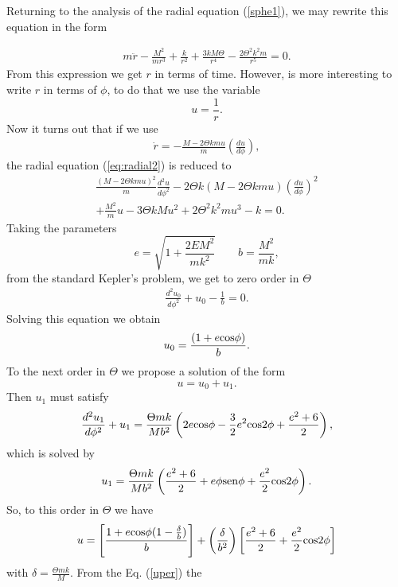 \documentclass[a4paper,12pt]{article}
\newcommand{\rof}[1]{(\ref{eq:#1})}
\begin{document}
Returning to the analysis of the radial equation (\ref{sphe1}), we
may rewrite this equation in the form

\begin{eqnarray}
m\ddot r -\frac{M^{2}}{mr^{3}} +\frac{k}{r^{2}}+\frac{3kM\Theta}{r^{4}}-
\frac{2\Theta^{2}k^{2}m}{r^{5}}=0. \label{eq:radial2}
\end{eqnarray}
From this expression we get $r$ in terms of time. However, is more
interesting to write $r$ in terms of $\phi$, to do that we use the
variable
$$u=\frac{1}{r}.$$
Now it turns out that if we use
\begin{eqnarray}
\dot r =-\frac{M-2\Theta km u}{m}\left(\frac{du}{d\phi}\right),
\end{eqnarray}
the radial equation \rof{radial2} is reduced to
\begin{eqnarray}
\frac{(M-2\Theta kmu)^{2}}{m}\frac{d^{2} u}{d\phi^{2}}-2\Theta k(M-2\Theta kmu)
\left(\frac{d u}{d\phi}\right)^{2}\nonumber \\
+\frac{M^{2}}{m}u-3\Theta kMu^{2}+2\Theta^{2}k^{2}mu^{3}-k=0.
\end{eqnarray}
Taking the parameters
$$e=\sqrt{1+\frac{2EM^{2}}{mk^{2}}}\quad  \quad b=\frac{M^{2}}{mk},$$
from the standard Kepler's problem, we get to zero order in
$\Theta$
\begin{eqnarray}
\frac{d^{2} u_{0}}{d\phi^{2}}+u_{0}-\frac{1}{b}=0.
\end{eqnarray}
Solving this equation we obtain
\begin{eqnarray}
u_{0}=\frac{(1+e{\rm cos} \phi)}{b}.
\end{eqnarray}
To the next order in $\Theta$  we propose a solution of the form
$$u=u_{0}+u_{1}.$$
Then $u_{1}$ must satisfy
\begin{eqnarray}
\frac{d^{2} u_{1}}{d\phi^{2}}+u_{1}=\frac{\Theta mk}{Mb^{2}}\left(2e {\rm cos}\phi
 -\frac{3}{2}e^{2}{\rm cos}2\phi +\frac{e^{2}+6}{2}\right),
\end{eqnarray}
which is solved by
\begin{eqnarray}
u_{1}=\frac{\Theta mk}{Mb^{2}}\left(\frac{e^{2}+6}{2} +e\phi {\rm sen}\phi+
\frac{e^{2}}{2}{\rm cos}2\phi\right).
\end{eqnarray}
So, to this order in $\Theta$ we have
\begin{eqnarray}\label{uper}
u=\left[ \frac{1+e{\rm cos}\phi(1 -\frac{\delta}{b})}{b}\right]+
\left(\frac{\delta}{b^{2}}\right)\left[\frac{e^{2}+6}{2}+\frac{e^{2}}{2}{\rm cos}2\phi \right]
\end{eqnarray}
with $\delta=\frac{\Theta mk}{M}.$ From the Eq. (\ref{uper}) the
\end{document}
